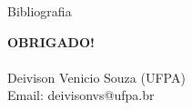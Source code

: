 \documentclass[12pt,ignorenonframetext,aspectratio=1610]{beamer}
\begin{document}


\begin{frame}[t,allowframebreaks]{Bibliografia}
	
\end{frame}


\begin{frame}[c]{}
	
	\begin{center}
		{\Large \textbf{OBRIGADO!}} \\~\\
		Deivison Venicio Souza (UFPA) \\
		Email: deivisonvs@ufpa.br \\~\\
		\Springtree[5]
	\end{center}
	
\end{frame}
\end{document}
